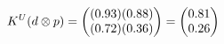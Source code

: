 \documentclass[preview]{standalone}
\begin{document}
\begin{align*}
\special{dvisvgm:raw <g id='unique000'>}K^U(d \otimes p) = \begin{pmatrix} (0.93)(0.88) \\ (0.72)(0.36) \end{pmatrix} = \begin{pmatrix} 0.81 \\ 0.26 \end{pmatrix}\special{dvisvgm:raw </g>}
\end{align*}
\end{document}
